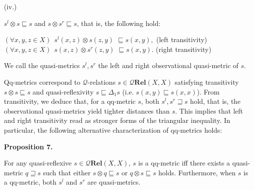  
 
\par\noindent  (iv.) 
 
$s^{l}\otimes s\sqsubseteq s$ and $s\otimes s^{r}\sqsubseteq s$, that is, the following hold:\par
 
 
     $\displaystyle(\forall x,y,z\in X)\ \ s^{l}(x,z)\otimes s(z,y)$ $\displaystyle\sqsubseteq s(x,y),$  (left transitivity)    $\displaystyle(\forall x,y,z\in X)\ \ s(x,z)\otimes s^{r}(z,y)$ $\displaystyle\sqsubseteq s(x,y).$  (right transitivity)   
 
 
 
We call the quasi-metrics $s^{l},s^{r}$ the left and right observational quasi-metric of $s$.\par
 
 
 
Qq-metrics correspond to $\mathcal{Q}$-relations $s\in\mathcal{Q}\mathbf{Rel}(X,X)$ satisfying transitivity $s\otimes s\sqsubseteq s$ and quasi-reflexivity $s\sqsubseteq\Delta_{1}s$ (i.e. $s(x,y)\sqsubseteq s(x,x)$). From transitivity, we deduce that, for a qq-metric $s$, both $s^{l},s^{r}\sqsupseteq s$ hold, that is, the observational quasi-metrics yield tighter distances than $s$. This implies that left and right transitivity read as stronger forms of the triangular inequality. In particular, the following alternative characterization of qq-metrics holds:\par
 
 
 
\par\medskip\noindent\textbf{Proposition 7.}\par
 
 
For any quasi-reflexive $s\in\mathcal{Q}\mathbf{Rel}(X,X)$, $s$ is a qq-metric iff there exists a quasi-metric $q\sqsupseteq s$ such that either $s\otimes q\sqsubseteq s$ or $q\otimes s\sqsubseteq s$ holds. Furthermore, when $s$ is a qq-metric, both $s^{l}$ and $s^{r}$ are quasi-metrics.\par
 
 
